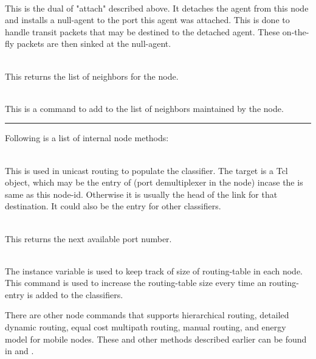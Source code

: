 \begin{flushleft}
\\%
This is the dual of "attach" described above. It detaches the agent
from this node 
and installs a null-agent to the port this agent was attached. This is
done to handle transit packets that may be destined to the detached
agent. These on-the-fly packets are then sinked  at the null-agent.

\\%
This returns the list of neighbors for the node.

\\%
This is a command to add  to the list of neighbors 
maintained by the node.

\rule{\linewidth}{0.3mm}
Following is a list of internal node methods:

\\%
This is used in unicast routing to populate the classifier. The target is a
Tcl object, which may be the entry of  (port demultiplexer in
the node) incase the  is same as this node-id.
Otherwise it is usually the head of the link for that destination. It
could also be the entry for other classifiers.

\\%
This returns the next available port number.

\\%
The instance variable  is used to keep track of size of
routing-table in each node. This command is used to increase the
routing-table size every time an routing-entry is added to the
classifiers.

There are other node commands that supports hierarchical
routing, detailed dynamic routing, equal cost multipath
routing, manual routing, and energy model for mobile nodes. These
and other methods described earlier can be found in 
 and .

\end{flushleft}
\endinput
